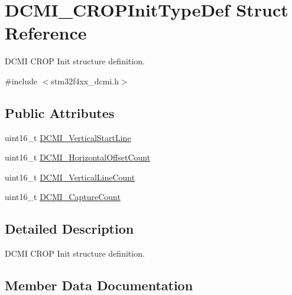 \hypertarget{struct_d_c_m_i___c_r_o_p_init_type_def}{}\section{D\+C\+M\+I\+\_\+\+C\+R\+O\+P\+Init\+Type\+Def Struct Reference}
\label{struct_d_c_m_i___c_r_o_p_init_type_def}


D\+C\+M\+I C\+R\+O\+P Init structure definition.  




{\ttfamily \#include $<$stm32f4xx\+\_\+dcmi.\+h$>$}

\subsection*{Public Attributes}
\begin{DoxyCompactItemize}
\item 
uint16\+\_\+t \hyperlink{struct_d_c_m_i___c_r_o_p_init_type_def_a4d4f4ef4975179f025d3cde589e380fe}{D\+C\+M\+I\+\_\+\+Vertical\+Start\+Line}
\item 
uint16\+\_\+t \hyperlink{struct_d_c_m_i___c_r_o_p_init_type_def_a33a42e98f575145749f0003fdc99f947}{D\+C\+M\+I\+\_\+\+Horizontal\+Offset\+Count}
\item 
uint16\+\_\+t \hyperlink{struct_d_c_m_i___c_r_o_p_init_type_def_aa12d393dbf969b568b4ec2a643456f20}{D\+C\+M\+I\+\_\+\+Vertical\+Line\+Count}
\item 
uint16\+\_\+t \hyperlink{struct_d_c_m_i___c_r_o_p_init_type_def_af379a3ff9fddb38be10b5f50946b55d9}{D\+C\+M\+I\+\_\+\+Capture\+Count}
\end{DoxyCompactItemize}


\subsection{Detailed Description}
D\+C\+M\+I C\+R\+O\+P Init structure definition. 

\subsection{Member Data Documentation}
\hypertarget{struct_d_c_m_i___c_r_o_p_init_type_def_af379a3ff9fddb38be10b5f50946b55d9}{}

